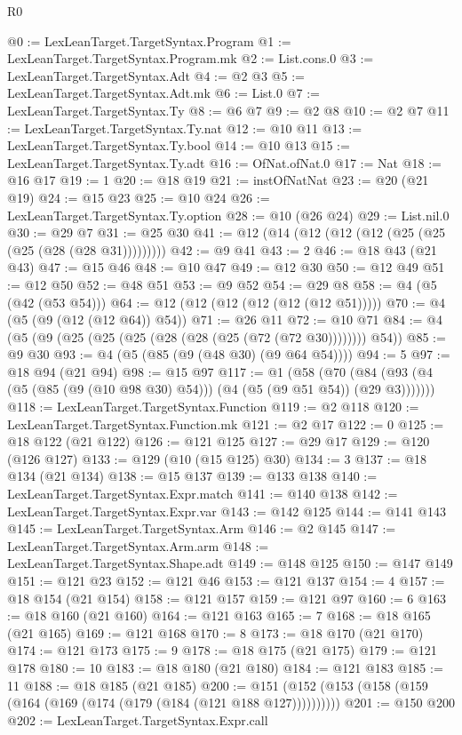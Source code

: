 \begin{lexlean}{R0}
\begin{coremodule}
@0 := LexLeanTarget.TargetSyntax.Program
@1 := LexLeanTarget.TargetSyntax.Program.mk
@2 := List.cons.{0}
@3 := LexLeanTarget.TargetSyntax.Adt
@4 := @2 @3
@5 := LexLeanTarget.TargetSyntax.Adt.mk
@6 := List.{0}
@7 := LexLeanTarget.TargetSyntax.Ty
@8 := @6 @7
@9 := @2 @8
@10 := @2 @7
@11 := LexLeanTarget.TargetSyntax.Ty.nat
@12 := @10 @11
@13 := LexLeanTarget.TargetSyntax.Ty.bool
@14 := @10 @13
@15 := LexLeanTarget.TargetSyntax.Ty.adt
@16 := OfNat.ofNat.{0}
@17 := Nat
@18 := @16 @17
@19 := 1
@20 := @18 @19
@21 := instOfNatNat
@23 := @20 (@21 @19)
@24 := @15 @23
@25 := @10 @24
@26 := LexLeanTarget.TargetSyntax.Ty.option
@28 := @10 (@26 @24)
@29 := List.nil.{0}
@30 := @29 @7
@31 := @25 @30
@41 := @12 (@14 (@12 (@12 (@12 (@25 (@25 (@25 (@28 (@28 @31)))))))))
@42 := @9 @41
@43 := 2
@46 := @18 @43 (@21 @43)
@47 := @15 @46
@48 := @10 @47
@49 := @12 @30
@50 := @12 @49
@51 := @12 @50
@52 := @48 @51
@53 := @9 @52
@54 := @29 @8
@58 := @4 (@5 (@42 (@53 @54)))
@64 := @12 (@12 (@12 (@12 (@12 (@12 @51)))))
@70 := @4 (@5 (@9 (@12 (@12 @64)) @54))
@71 := @26 @11
@72 := @10 @71
@84 := @4 (@5 (@9 (@25 (@25 (@25 (@28 (@28 (@25 (@72 (@72 @30)))))))) @54))
@85 := @9 @30
@93 := @4 (@5 (@85 (@9 (@48 @30) (@9 @64 @54))))
@94 := 5
@97 := @18 @94 (@21 @94)
@98 := @15 @97
@117 := @1
    (@58 (@70 (@84 (@93 (@4 (@5 (@85 (@9 (@10 @98 @30) @54))) (@4 (@5 (@9 @51 @54)) (@29 @3)))))))
@118 := LexLeanTarget.TargetSyntax.Function
@119 := @2 @118
@120 := LexLeanTarget.TargetSyntax.Function.mk
@121 := @2 @17
@122 := 0
@125 := @18 @122 (@21 @122)
@126 := @121 @125
@127 := @29 @17
@129 := @120 (@126 @127)
@133 := @129 (@10 (@15 @125) @30)
@134 := 3
@137 := @18 @134 (@21 @134)
@138 := @15 @137
@139 := @133 @138
@140 := LexLeanTarget.TargetSyntax.Expr.match
@141 := @140 @138
@142 := LexLeanTarget.TargetSyntax.Expr.var
@143 := @142 @125
@144 := @141 @143
@145 := LexLeanTarget.TargetSyntax.Arm
@146 := @2 @145
@147 := LexLeanTarget.TargetSyntax.Arm.arm
@148 := LexLeanTarget.TargetSyntax.Shape.adt
@149 := @148 @125
@150 := @147 @149
@151 := @121 @23
@152 := @121 @46
@153 := @121 @137
@154 := 4
@157 := @18 @154 (@21 @154)
@158 := @121 @157
@159 := @121 @97
@160 := 6
@163 := @18 @160 (@21 @160)
@164 := @121 @163
@165 := 7
@168 := @18 @165 (@21 @165)
@169 := @121 @168
@170 := 8
@173 := @18 @170 (@21 @170)
@174 := @121 @173
@175 := 9
@178 := @18 @175 (@21 @175)
@179 := @121 @178
@180 := 10
@183 := @18 @180 (@21 @180)
@184 := @121 @183
@185 := 11
@188 := @18 @185 (@21 @185)
@200 := @151 (@152 (@153 (@158 (@159 (@164 (@169 (@174 (@179 (@184 (@121 @188 @127))))))))))
@201 := @150 @200
@202 := LexLeanTarget.TargetSyntax.Expr.call

\end{coremodule}
\end{lexlean}
